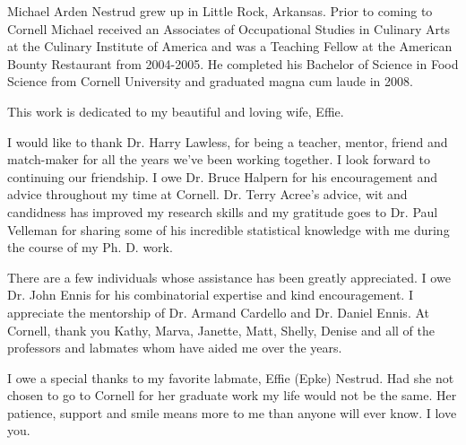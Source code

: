 \documentclass[phd,tocprelim]{cornell}
\begin{document}
\begin{biosketch}
Michael Arden Nestrud grew up in Little Rock, Arkansas.  Prior to coming to Cornell Michael received an Associates of Occupational Studies in Culinary Arts at the Culinary Institute of America and was a Teaching Fellow at the American Bounty Restaurant from 2004-2005.  He completed his Bachelor of Science in Food Science from Cornell University and graduated magna cum laude in 2008.  
\end{biosketch}
\begin{dedication}
This work is dedicated to my beautiful and loving wife, Effie.
\end{dedication}
\begin{acknowledgements}

I would like to thank Dr. Harry Lawless, for being a teacher, mentor, friend and match-maker for all the years we’ve been working together.  I look forward to continuing our friendship.  I owe Dr. Bruce Halpern for his encouragement and advice throughout my time at Cornell.  Dr. Terry Acree's advice, wit and candidness has improved my research skills and my gratitude goes to Dr. Paul Velleman for sharing some of his incredible statistical knowledge with me during the course of my Ph. D. work.  

There are a few individuals whose assistance has been greatly appreciated.  I owe Dr. John Ennis for his combinatorial expertise and kind encouragement.  I appreciate the mentorship of Dr. Armand Cardello and Dr. Daniel Ennis.  At Cornell, thank you Kathy, Marva, Janette, Matt, Shelly, Denise and all of the professors and labmates whom have aided me over the years.  

I owe a special thanks to my favorite labmate,  Effie (Epke) Nestrud.  Had she not chosen to go to Cornell for her graduate work my life would not be the same.  Her patience, support and smile means more to me than anyone will ever know.  I love you.

\end{acknowledgements}
\contentspage
{}
\tablelistpage
{}
\figurelistpage

\normalspacing \setcounter{page}{1} 
\pagestyle{cornell} \addtolength{\parskip}{0.5\baselineskip}










\end{document}
